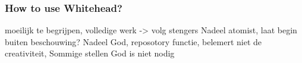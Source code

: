 \begin{comment}
p84 
whiteheads notion van creativity is heel algemeen ivm zijn strefen van een verklaring voor allse. Bergson en Hegel concept van creativty liggen dichter bij het event zelf maar zijn mogelijk niet algemeen toepasbaar.

p84
His philosophy offers one of the few serious endeavors fo formulate a comprehensive  system aimed ad harmononizing the thoroughness and universality of philosophical questioning with the state of knoeledge attainend by modern science \cite[p84]{rapp1990whitehead}

seibt, kan als kritiek gezien worden whitehead valt hier onder enk ik:
While older, speculative, process metaphysics embraced the idea of purposes and creativity in nature, and allowed for the explanatory category of a ‘self-realizing’ or ‘self-engendering’ entity (in various terminological guises)
\subsubsection{What is his model?}

Voorbeeld met de begrippen van Whitehead:
Process
Actueal-entity
Creativity
Concrenesse
Prehension
Misschien ook de categorien van zijnden.

\cite{whitehead1929process}
Whitehead builds his theory on three universal categories are 'creativity', 'many', 'one' and his concrete elements are 'actual entity', 'prehension', 'nexus'.


Whitehead replaces the mechanical substance paradigm with te idea of a of 
the universal relatedness and reciprocal prehension of real occasions, factors that are expressed in the concrete elements of 'actual entity', 'prehension', 'nexus'.





\end{comment}

\subsubsection{How to use Whitehead?}
moeilijk te begrijpen, volledige werk -> volg stengers
Nadeel atomist, laat begin buiten beschouwing?
Nadeel God, reposotory functie, belemert niet de creativiteit, Sommige stellen God is niet nodig
